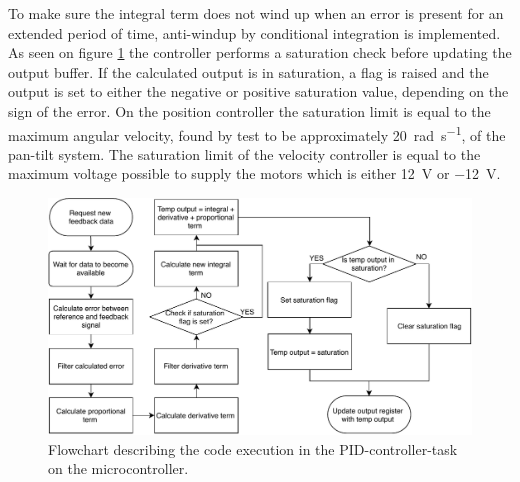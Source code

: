 \documentclass[../../main.tex]{subfiles}
\begin{document}

To make sure the integral term does not wind up when an error is present for an extended period of time, anti-windup by conditional integration is implemented. As seen on figure \ref{fig:PIDControllerFlowchart} the controller performs a saturation check before updating the output buffer. If the calculated output is in saturation, a flag is raised and the output is set to either the negative or positive saturation value, depending on the sign of the error. On the position controller the saturation limit is equal to the maximum angular velocity, found by test to be approximately \SI{20}{\radian\per\second}, of the pan-tilt system. The saturation limit of the velocity controller is equal to the maximum voltage possible to supply the motors which is either \SI{12}{\volt} or \SI{-12}{\volt}.

\begin{figure}[H]
    \centering
    \includegraphics[width=\textwidth]{Sections/System_Implementation/Images/PIDControllerFlowchart.pdf}
    \caption{Flowchart describing the code execution in the PID-controller-task on the microcontroller.}
    \label{fig:PIDControllerFlowchart}
\end{figure}
\end{document}
